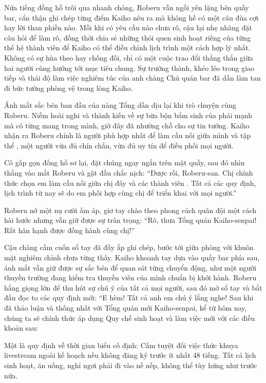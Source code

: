 \documentclass[../main.tex]{subfiles}
\begin{document}
Nửa tiếng đồng hồ trôi qua nhanh chóng, Roberu vẫn ngồi yên lặng bên quầy bar, cẩn thận ghi chép từng điểm Kaiho nêu ra mà không hề có một câu đùa cợt hay lời than phiền nào. Mỗi khi có yêu cầu nào chưa rõ, cậu lại nhẹ nhàng đặt câu hỏi để làm rõ, đồng thời chia sẻ những thói quen sinh hoạt riêng của từng thế hệ thành viên để Kaiho có thể điều chỉnh lịch trình một cách hợp lý nhất. Không có sự hùa theo hay chống đối, chỉ có một cuộc trao đổi thẳng thắn giữa hai người cùng hướng tới mục tiêu chung. Sự trưởng thành, khéo léo trong giao tiếp và thái độ làm việc nghiêm túc của anh chàng Chủ quán bar đã dần làm tan đi bức tường phòng vệ trong lòng Kaiho.

Ánh mắt sắc bén ban đầu của nàng Tổng dần dịu lại khi trò chuyện cùng Roberu. Niềm hoài nghi và thành kiến về sự bừa bộn bẩm sinh của phái mạnh mà cô từng mang trong mình, giờ đây đã nhường chỗ cho sự tin tưởng. Kaiho nhận ra Roberu chính là người phù hợp nhất để làm cầu nối giữa mình và tập thể \hls, một người vừa đủ chín chắn, vừa đủ uy tín để điều phối mọi người.

Cô gấp gọn đống hồ sơ lại, đặt chúng ngay ngắn trên mặt quầy, sau đó nhìn thẳng vào mắt Roberu và gật đầu chắc nịch: ``Được rồi, Roberu-san. Chị chính thức chọn em làm cầu nối giữa chị đây và các thành viên \hls. Tất cả các quy định, lịch trình từ nay sẽ do em phối hợp cùng chị để triển khai với mọi người.''

Roberu nở một nụ cười ấm áp, giơ tay chào theo phong cách quân đội một cách hài hước nhưng vẫn giữ được sự trân trọng: ``Rõ, thưa Tổng quản Kaiho-senpai! Rất hân hạnh được đồng hành cùng chị!''

Cậu chàng cầm cuốn sổ tay đã đầy ắp ghi chép, bước tới giữa phòng với khuôn mặt nghiêm chỉnh chưa từng thấy. Kaiho khoanh tay dựa vào quầy bar phía sau, ánh mắt vẫn giữ được sự sắc bén để quan sát từng chuyển động, như một người thuyền trưởng đang kiểm tra thuyền viên của mình chuẩn bị khởi hành. Roberu hắng giọng lớn để thu hút sự chú ý của tất cả mọi người, sau đó mở sổ tay và bắt đầu đọc to các quy định mới: ``E hèm! Tất cả anh em chú ý lắng nghe! Sau khi đã thảo luận và thống nhất với Tổng quản mới Kaiho-senpai, kể từ hôm nay, chúng ta sẽ chính thức áp dụng Quy chế sinh hoạt và làm việc mới với các điều khoản sau:

Một là quy định về thời gian biểu cố định: Cấm tuyệt đối việc thức khuya livestream ngoài kế hoạch nếu không đăng ký trước ít nhất 48 tiếng. Tất cả lịch sinh hoạt, ăn uống, nghỉ ngơi phải đi vào nề nếp, không thể tùy hứng như trước nữa.
\end{document}
